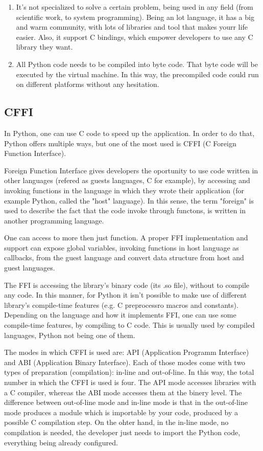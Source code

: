 \begin{enumerate}
           \item It's not specialized to solve a certain problem, being used in any field (from scientific work, to system programming). Being an lot language, it has a big and warm community, with lots of libraries and tool that makes yourr life easier. Also, it support C bindings, which empower developers to use any C library they want.
           \item All Python code needs to be compiled into byte code. That byte code will be executed by the virtual machine. In this way, the precompiled code could run on different platforms without any hesitation.
        \end{enumerate}

    \subsection{CFFI}
        In Python, one can use C code to speed up the application. In order to do that, Python offers multiple ways, but one of the most used is CFFI (C Foreign Function Interface).

        Foreign Function Interface gives developers the oportunity to use code written in other languages (refered as guests languages, C for example), by accessing and invoking functions in the language in which they wrote their application (for example Python, called the "host" language). In this sense, the term "foreign" is used to describe the fact that the code invoke through functons, is written in another programming language.

        One can access to more then just function. A proper FFI implementation and support can expose global variables, invoking functions in host language as callbacks, from the guest language and convert data structure from host and guest languages.

        The FFI is accessing the library's binary code (its .so file), without to compile any code. In this manner, for Python it isn't possible to make use of different library's compile-time features (e.g. C preprocessro macros and constants).
        Depending on the language and how it implements FFI, one can use some compile-time features, by compiling to C code. This is usually used by compiled languages, Python not being one of them.

        The modes in which CFFI is used are: API (Application Programm Interface) and ABI (Application Binary Interface). Each of those modes come with two types of preparation (compilation): in-line and out-of-line. In this way, the total number in which the CFFI is used is four. The API mode accesses libraries with a C compiler, whereas the ABI mode accesses them at the binery level.
        The difference between out-of-line mode and in-line mode is that in the out-of-line mode produces a module which is importable by your code, produced by a possible C compilation step. On the ohter hand, in the in-line mode, no compilation is needed, the developer just needs to import the Python code, everything being already configured.
